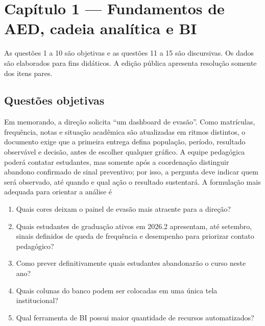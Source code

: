 \section{Capítulo 1 --- Fundamentos de AED, cadeia analítica e BI}

As questões 1 a 10 são objetivas e as questões 11 a 15 são discursivas. Os dados são elaborados para fins didáticos. A edição pública apresenta resolução somente dos itens pares.

\subsection{Questões objetivas}

\TextoBase Em memorando, a direção solicita ``um dashboard de evasão''. Como matrículas, frequência, notas e situação acadêmica são atualizadas em ritmos distintos, o documento exige que a primeira entrega defina população, período, resultado observável e decisão, antes de escolher qualquer gráfico. A equipe pedagógica poderá contatar estudantes, mas somente após a coordenação distinguir abandono confirmado de sinal preventivo; por isso, a pergunta deve indicar quem será observado, até quando e qual ação o resultado sustentará.
\FonteDidatica
\Comando A formulação mais adequada para orientar a análise é
\begin{enumerate}[label=\Alph*)]
\item Quais cores deixam o painel de evasão mais atraente para a direção?
\item Quais estudantes de graduação ativos em 2026.2 apresentam, até setembro, sinais definidos de queda de frequência e desempenho para priorizar contato pedagógico?
\item Como prever definitivamente quais estudantes abandonarão o curso neste ano?
\item Quais colunas do banco podem ser colocadas em uma única tela institucional?
\item Qual ferramenta de BI possui maior quantidade de recursos automatizados?
\end{enumerate}


